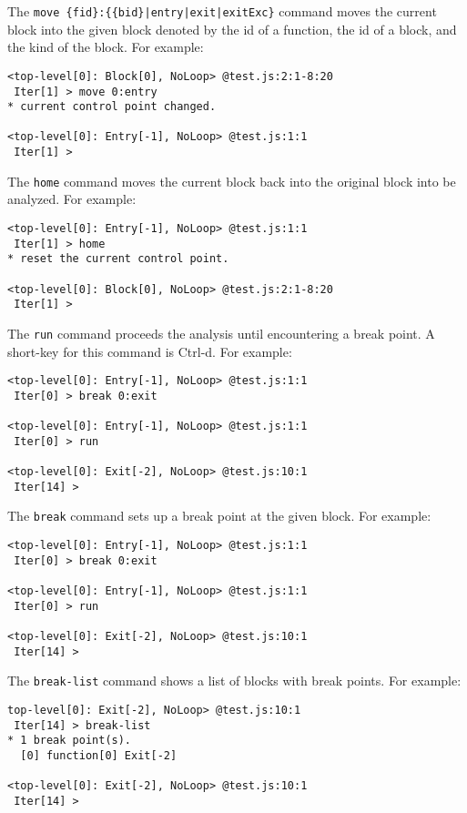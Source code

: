 \medskip
The \verb!move {fid}:{{bid}|entry|exit|exitExc}! command
moves the current block into the given block denoted by the id of a function,
the id of a block, and the kind of the block.  For example:
{\small
\begin{verbatim}
<top-level[0]: Block[0], NoLoop> @test.js:2:1-8:20
 Iter[1] > move 0:entry
* current control point changed.

<top-level[0]: Entry[-1], NoLoop> @test.js:1:1
 Iter[1] >
\end{verbatim}
}

\medskip
The \verb!home! command moves the current block back into the original
block into be analyzed.  For example:
{\small
\begin{verbatim}
<top-level[0]: Entry[-1], NoLoop> @test.js:1:1
 Iter[1] > home
* reset the current control point.

<top-level[0]: Block[0], NoLoop> @test.js:2:1-8:20
 Iter[1] >
\end{verbatim}
}

\medskip
The \verb!run! command proceeds the analysis until encountering a break
point.  A short-key for this command is Ctrl-d.  For example:
{\small
\begin{verbatim}
<top-level[0]: Entry[-1], NoLoop> @test.js:1:1
 Iter[0] > break 0:exit

<top-level[0]: Entry[-1], NoLoop> @test.js:1:1
 Iter[0] > run

<top-level[0]: Exit[-2], NoLoop> @test.js:10:1
 Iter[14] >
\end{verbatim}
}

\medskip
The \verb!break! command sets up a break point at the given block.
For example:
{\small
\begin{verbatim}
<top-level[0]: Entry[-1], NoLoop> @test.js:1:1
 Iter[0] > break 0:exit

<top-level[0]: Entry[-1], NoLoop> @test.js:1:1
 Iter[0] > run

<top-level[0]: Exit[-2], NoLoop> @test.js:10:1
 Iter[14] >
\end{verbatim}
}

\medskip
The \verb!break-list! command shows a list of blocks with
break points.  For example:
{\small
\begin{verbatim}
top-level[0]: Exit[-2], NoLoop> @test.js:10:1
 Iter[14] > break-list
* 1 break point(s).
  [0] function[0] Exit[-2]

<top-level[0]: Exit[-2], NoLoop> @test.js:10:1
 Iter[14] >
\end{verbatim}
}

